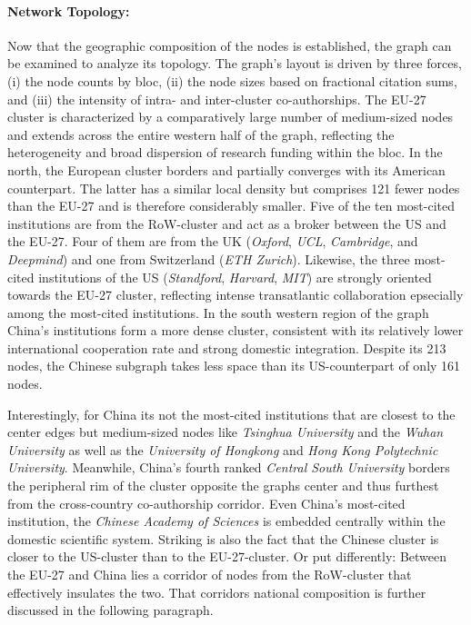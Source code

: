 \documentclass{article}
\begin{document}
	\paragraph{Network Topology:} Now that the geographic composition of the nodes is established, the graph can be examined to analyze its topology. The graph’s layout is driven by three forces, (i) the node counts by bloc, (ii) the node sizes based on fractional citation sums, and (iii) the intensity of intra- and inter-cluster co-authorships. The EU-27 cluster is characterized by a comparatively large number of medium-sized nodes and extends across the entire western half of the graph, reflecting the heterogeneity and broad dispersion of research funding within the bloc. In the north, the European cluster borders and partially converges with its American counterpart. The latter has a similar local density but comprises 121 fewer nodes than the EU-27 and is therefore considerably smaller. Five of the ten most-cited institutions are from the RoW-cluster and act as a broker between the US and the EU-27. Four of them are from the UK (\textit{Oxford}, \textit{UCL}, \textit{Cambridge}, and \textit{Deepmind}) and one from Switzerland (\textit{ETH Zurich}). Likewise, the three most-cited institutions of the US (\textit{Standford}, \textit{Harvard}, \textit{MIT}) are strongly oriented towards the EU-27 cluster, reflecting intense transatlantic collaboration epsecially among the most-cited institutions. In the south western region of the graph China’s institutions form a more dense cluster, consistent with its relatively lower international cooperation rate and strong domestic integration. Despite its 213 nodes, the Chinese subgraph takes less space than its US-counterpart of only 161 nodes. 
	
	Interestingly, for China its not the most-cited institutions that are closest to the center edges but medium-sized nodes like \textit{Tsinghua University} and the \textit{Wuhan University} as well as the \textit{University of Hongkong} and \textit{Hong Kong Polytechnic University}. Meanwhile, China's fourth ranked \textit{Central South University} borders the peripheral rim of the cluster opposite the graphs center and thus furthest from the cross-country co-authorship corridor. Even China's most-cited institution, the \textit{Chinese Academy of Sciences} is embedded centrally within the domestic scientific system. Striking is also the fact that the Chinese cluster is closer to the US-cluster than to the EU-27-cluster. Or put differently: Between the EU-27 and China lies a corridor of nodes from the RoW-cluster that effectively insulates the two. That corridors national composition is further discussed in the following paragraph.
	
\end{document}
